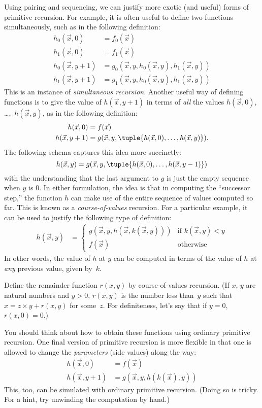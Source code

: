 \documentclass[../../../include/open-logic-section]{subfiles}
\begin{document}

Using pairing and sequencing, we can justify more exotic (and
useful) forms of primitive recursion. For example, it is often useful
to define two functions simultaneously, such as in the following
definition:
\begin{align*}
h_0(\vec x, 0) & = f_0(\vec x) \\
h_1(\vec x, 0) & = f_1(\vec x) \\
h_0(\vec x, y+1) & = g_0(\vec x, y, h_0(\vec x, y), h_1(\vec x, y)) \\
h_1(\vec x, y+1) & = g_1(\vec x, y, h_0(\vec x, y), h_1(\vec x, y))
\end{align*}
This is an instance of \emph{simultaneous recursion}. Another useful
way of defining functions is to give the value of $h(\vec x, y+1)$ in
terms of \emph{all} the values $h(\vec x, 0)$, \dots,~$h(\vec x, y)$, as in
the following definition:
\begin{align*}
h(\vec x, 0) & = f(\vec x) \\
h(\vec x, y+1) & = g(\vec x, y, \tuple{h(\vec x, 0), \dots, h(\vec x, y)}).
\end{align*}
The following schema captures this idea more succinctly:
\[
h(\vec x, y) = g(\vec x, y, \tuple{h(\vec x, 0), \dots, h(\vec x, y-1)})
\]
with the understanding that the last argument to $g$ is just the
empty sequence when $y$ is $0$. In either formulation, the idea is
that in computing the ``successor step,'' the function $h$ can make
use of the entire sequence of values computed so far.
This is known as a \emph{course-of-values} recursion. For a particular
example, it can be used to justify the following type of definition:
\begin{align*}
h(\vec x, y) & = \begin{cases}
  g(\vec x, y, h(\vec x, k(\vec x, y))) & \text{if $k(\vec x, y) < y$} \\
  f(\vec x) & \text{otherwise}
\end{cases}
\end{align*}
In other words, the value of $h$ at $y$ can be computed in terms of
the value of $h$ at \emph{any} previous value, given by~$k$.


\begin{prob}
  Define the remainder function $r(x,y)$ by course-of-values
  recursion. (If $x$, $y$ are natural numbers and $y > 0$, $r(x,y)$ is
  the number less than~$y$ such that $x = z\times y + r(x,y)$ for
  some~$z$. For definiteness, let's say that if $y=0$, $r(x,0) = 0$.)
\end{prob}

You should think about how to obtain these functions using ordinary
primitive recursion. One final version of primitive recursion is more
flexible in that one is allowed to change the \emph{parameters} (side
values) along the way:
\begin{align*}
h(\vec x, 0) & = f(\vec x) \\
h(\vec x, y+1) & = g(\vec x, y, h(k(\vec x), y))
\end{align*}
This, too, can be simulated with ordinary primitive recursion. (Doing
so is tricky. For a hint, try unwinding the computation by hand.)
\end{document}
